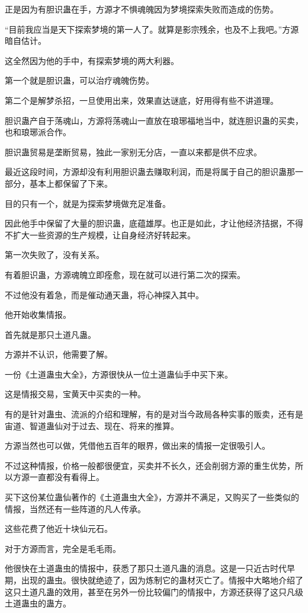 \begin{this_body}
正是因为有胆识蛊在手，方源才不惧魂魄因为梦境探索失败而造成的伤势。

“目前我应当是天下探索梦境的第一人了。就算是影宗残余，也及不上我吧。”方源暗自估计。

这全然因为他的手中，有探索梦境的两大利器。

第一个就是胆识蛊，可以治疗魂魄伤势。

第二个是解梦杀招，一旦使用出来，效果直达谜底，好用得有些不讲道理。

胆识蛊产自于荡魂山，方源将荡魂山一直放在琅琊福地当中，就连胆识蛊的买卖，也和琅琊派合作。

胆识蛊贸易是垄断贸易，独此一家别无分店，一直以来都是供不应求。

最近这段时间，方源却没有利用胆识蛊去赚取利润，而是将属于自己的胆识蛊那一部分，基本上都保留了下来。

目的只有一个，就是为探索梦境做充足准备。

因此他手中保留了大量的胆识蛊，底蕴雄厚。也正是如此，才让他经济拮据，不得不扩大一些资源的生产规模，让自身经济好转起来。

第一次失败了，没有关系。

有着胆识蛊，方源魂魄立即痊愈，现在就可以进行第二次的探索。

不过他没有着急，而是催动通天蛊，将心神探入其中。

他开始收集情报。

首先就是那只土道凡蛊。

方源并不认识，他需要了解。

一份《土道蛊虫大全》，方源很快从一位土道蛊仙手中买下来。

这是情报交易，宝黄天中买卖的一种。

有的是针对蛊虫、流派的介绍和理解，有的是对当今政局各种实事的贩卖，还有是宙道、智道蛊仙对于过去、现在、将来的推算。

方源当然也可以做，凭借他五百年的眼界，做出来的情报一定很吸引人。

不过这种情报，价格一般都很便宜，买卖并不长久，还会削弱方源的重生优势，所以方源一直都没有看得上。

买下这份某位蛊仙著作的《土道蛊虫大全》，方源并不满足，又购买了一些类似的情报，当然还有一些阵道的凡人传承。

这些花费了他近十块仙元石。

对于方源而言，完全是毛毛雨。

他很快在土道蛊虫的情报中，获悉了那只土道凡蛊的消息。这是一只近古时代早期，出现的蛊虫。很快就绝迹了，因为炼制它的蛊材灭亡了。情报中大略地介绍了这只土道凡蛊的效用，甚至在另外一份比较偏门的情报中，方源还获得了这只凡级土道蛊虫的蛊方。

\end{this_body}

